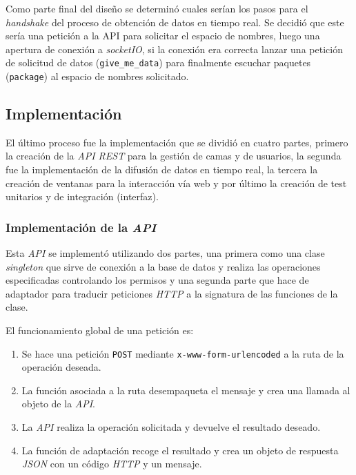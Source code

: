Como parte final del diseño se determinó cuales serían los pasos para el \textit{handshake} del proceso de obtención de datos en tiempo real. Se decidió que este sería una petición a la API para solicitar el espacio de nombres, luego una apertura de conexión a \textit{socketIO}, si la conexión era correcta lanzar una petición de solicitud de datos (\texttt{give\_me\_data}) para finalmente escuchar paquetes (\texttt{package}) al espacio de nombres solicitado.

\subsection{Implementación}
El último proceso fue la implementación que se dividió en cuatro partes, primero la creación de la \textit{API REST} para la gestión de camas y de usuarios, la segunda fue la implementación de la difusión de datos en tiempo real, la tercera la creación de ventanas para la interacción vía web y por último la creación de test unitarios y de integración (interfaz).

\subsubsection{Implementación de la \textit{API}}
Esta \textit{API} se implementó utilizando dos partes, una primera como una clase \textit{singleton} que sirve de conexión a la base de datos y realiza las operaciones especificadas controlando los permisos y una segunda parte que hace de adaptador para traducir peticiones \textit{HTTP} a la signatura de las funciones de la clase.

El funcionamiento global de una petición es:
\begin{enumerate}
	\item Se hace una petición \texttt{POST} mediante \texttt{x-www-form-urlencoded} a la ruta de la operación deseada.
	
	\item La función asociada a la ruta desempaqueta el mensaje y crea una llamada al objeto de la \textit{API}.
	
	\item La \textit{API} realiza la operación solicitada y devuelve el resultado deseado.
	
	\item La función de adaptación recoge el resultado y crea un objeto de respuesta \textit{JSON} con un código \textit{HTTP} y un mensaje.
\end{enumerate}

